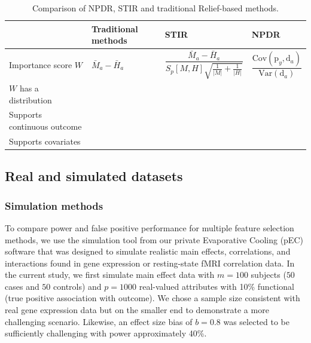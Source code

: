 \documentclass[10pt]{article}
\begin{document}
\begin{table}[h]

\begin{tabular}{p{4.5cm}C{2cm}C{3.2cm}C{2.7cm}}
                           & Traditional methods & STIR    & NPDR \\
\hline
Importance score $W$        & $\bar{M}_a - \bar{H}_a    $                      & $\dfrac{\bar{M}_a - \bar{H}_a }{S_p[M,H]\sqrt{\frac{1}{|M|}+\frac{1}{|H|}}}$ &   $\dfrac{\text{Cov}\left( \text{p}_y ,\text{d}_a  \right)}{\text{Var}\left( \text{d}_a  \right)}$ \\
$W$ has a distribution       &                                &      &   \\
Supports continuous outcome &                               &       &   \\
Supports covariates         &                                &       &  \\
\hline
\end{tabular}
\caption{Comparison of NPDR, STIR and traditional Relief-based methods.}
\label{tab:compare_npdr}
\end{table}



\subsection{Real and simulated datasets}




\subsubsection{Simulation methods}
To compare power and false positive performance for multiple feature selection methods, we use the simulation tool from our private Evaporative Cooling (pEC) software \cite{le17} that was designed to simulate realistic main effects, correlations, and interactions found in gene expression or resting-state fMRI correlation data. In the current study, we first simulate main effect data with $m=100$ subjects ($50$ cases and $50$ controls) and $p=1000$ real-valued attributes with 10\% functional (true positive association with outcome). We chose a sample size consistent with real gene expression data but on the smaller end to demonstrate a more challenging scenario. Likewise, an effect size bias of $b=0.8$ was selected to be sufficiently challenging with power approximately 40\%. 
\end{document}
